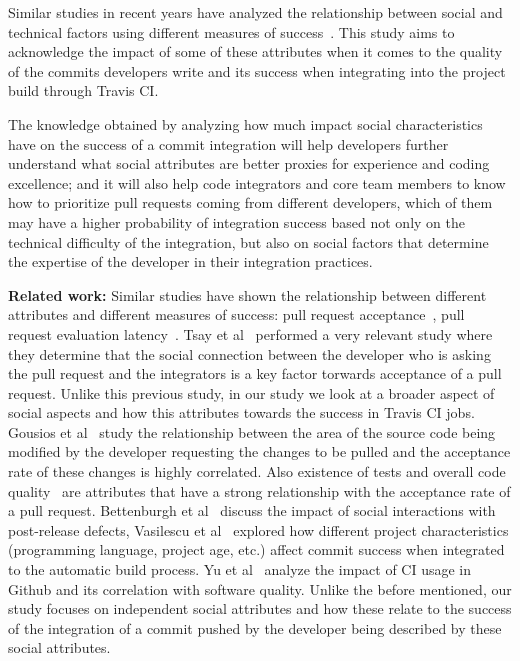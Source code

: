\documentclass[10pt, conference]{IEEEtran}
\begin{document}
Similar studies in recent years have analyzed the relationship between social 
and technical factors using different measures of success~\cite{tsay14icse,tsay14fse}. 
This study aims to acknowledge the impact of some of these attributes when it 
comes to the quality of the commits developers write and its success when 
integrating into the project build through Travis CI. 

The knowledge obtained by 
analyzing how much impact social characteristics have on the success of a commit 
integration will help developers further understand what social attributes are 
better proxies for experience and coding excellence; and it will also help code 
integrators and core team members to know how to prioritize pull requests coming 
from different developers, which of them may have a higher probability of 
integration success based not only on the technical difficulty of the 
integration, but also on social factors that determine the expertise of the 
developer in their integration practices.

\textbf{Related work:}
Similar studies have shown the relationship between different attributes and 
different measures of success: pull request acceptance~\cite{gousios14, 
gousios15,tsay14icse,tsay14fse}, pull request evaluation latency~\cite{Yu15}.
Tsay et al~\cite{tsay14icse} performed a very relevant study where they 
determine that the social connection between the developer who is asking the 
pull request and the integrators is a key factor torwards acceptance of a pull 
request. Unlike this previous study, in our study we look at a broader aspect of 
social aspects and how this attributes towards the success in Travis CI jobs. 
Gousios et al~\cite{gousios14} study the relationship between the area of the 
source code being modified by the developer requesting the changes to be pulled 
and the acceptance rate of these changes is highly correlated. Also existence of 
tests and overall code quality~\cite{gousios15} are attributes that have a 
strong relationship with the acceptance rate of a pull request. Bettenburgh et 
al~\cite{bettenburgh10} discuss the impact of social interactions with 
post-release defects, Vasilescu et al~\cite{vasilescu14} explored how different 
project characteristics (programming language, project age, etc.) affect commit 
success when integrated to the automatic build process. Yu et al~\cite{yu16} 
analyze the impact of CI usage in Github and its correlation with software 
quality. Unlike the before mentioned, our study focuses on independent social 
attributes and how these relate to the success of the integration of a commit 
pushed by the developer being described by these social attributes.
\end{document}
